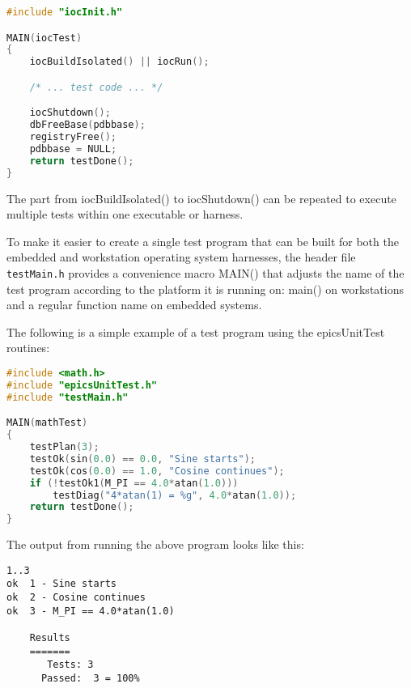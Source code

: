 \begin{lstlisting}[language=C]
#include "iocInit.h"

MAIN(iocTest)
{
    iocBuildIsolated() || iocRun();

    /* ... test code ... */

    iocShutdown();
    dbFreeBase(pdbbase);
    registryFree();
    pdbbase = NULL;
    return testDone();
}
\end{lstlisting}

The part from iocBuildIsolated() to iocShutdown() can be repeated to execute multiple tests within one executable or harness.

To make it easier to create a single test program that can be built for both the embedded and workstation operating system harnesses, the header file \verb|testMain.h| provides a convenience macro MAIN() that adjusts the name of the test program according to the platform it is running on: main() on workstations and a regular function name on embedded systems.

The following is a simple example of a test program using the epicsUnitTest routines:

\begin{lstlisting}[language=C]
#include <math.h>
#include "epicsUnitTest.h"
#include "testMain.h"

MAIN(mathTest)
{
    testPlan(3);
    testOk(sin(0.0) == 0.0, "Sine starts");
    testOk(cos(0.0) == 1.0, "Cosine continues");
    if (!testOk1(M_PI == 4.0*atan(1.0)))
        testDiag("4*atan(1) = %g", 4.0*atan(1.0));
    return testDone();
}
\end{lstlisting}

The output from running the above program looks like this:

\begin{verbatim}
1..3
ok  1 - Sine starts
ok  2 - Cosine continues
ok  3 - M_PI == 4.0*atan(1.0)

    Results
    =======
       Tests: 3
      Passed:  3 = 100%

\end{verbatim}
